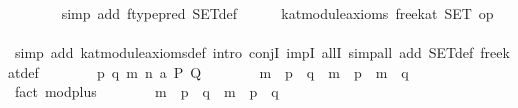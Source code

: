 \begin{isabellebody}
\ \ \ \ \ \ \isamarkupfalse%
\ {}simp\ add{}\ ftype{}pred\ SET{}def{}\isanewline
\isanewline
\ \ \ \ \isamarkupfalse%
\ {}kat{}module{}axioms\ free{}kat\ SET\ {}op\ {}{}{}\isanewline
\ \ \ \ \isamarkupfalse%
\ {}simp\ add{}\ kat{}module{}axioms{}def{}\ intro\ conjI\ impI\ allI{}\ simp{}all\ add{}\ SET{}def\ free{}kat{}def{}\isanewline
\ \ \ \ \ \ \isamarkupfalse%
\ p\ q\ m\ n\ a\ P\ Q\isanewline
\ \ \ \ \ \ \isamarkupfalse%
\ {}m\ {}\ {}p\ {}\ q{}\ {}\ m\ {}\ p\ {}\ m\ {}\ q{}\isanewline
\ \ \ \ \ \ \ \ \isamarkupfalse%
\ {}fact\ mod{}plus{}\isanewline
\ \ \ \ \ \ \isamarkupfalse%
\ {}m\ {}\ {}p\ {}\ q{}\ {}\ {}m\ {}\ p{}\ {}\ q{}\isanewline
\ \ \ \ \ \ \ \ \isamarkupfalse%

\end{isabellebody}
